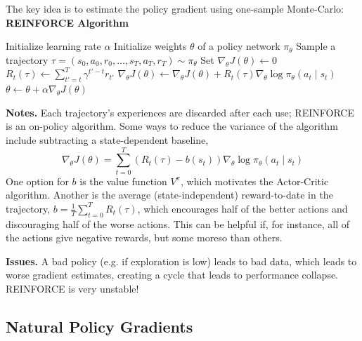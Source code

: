 \documentclass[11pt, letterpaper]{article}
\begin{document}
\begin{concept}
    The key idea is to estimate the policy gradient using one-sample Monte-Carlo:
    \algline
    \textbf{REINFORCE Algorithm}
    \begin{algorithmic}[1]
    \State Initialize learning rate \(\alpha\)
    \State Initialize weights \(\theta\) of a policy network \(\pi_\theta\)
        \State Sample a trajectory \(\tau = (s_0, a_0, r_0, \dots, s_T, a_T, r_T) \sim \pi_\theta\)
        \State Set \(\nabla_\theta J(\theta) \gets 0\)
            \State \(R_t(\tau) \gets \sum_{t'=t}^T \gamma^{t'-t} r_{t'}\)
            \State \(\nabla_\theta J(\theta) \gets \nabla_\theta J(\theta) + R_t(\tau) \nabla_\theta \log \pi_\theta(a_t \mid s_t)\)
        \EndFor
        \State \(\theta \leftarrow \theta + \alpha \nabla_\theta J(\theta)\)
    \EndFor
    \end{algorithmic}
    \algline
\end{concept}

\begin{remark}
    \textbf{Notes.} Each trajectory's experiences are discarded after each use; REINFORCE is an on-policy algorithm. Some ways to reduce the variance of the algorithm include subtracting a state-dependent baseline, 
    \[
        \nabla_\theta J(\theta) = \sum_{t=0}^T (R_t(\tau) - b(s_t)) \nabla_\theta \log \pi_\theta(a_t \mid s_t)
    \]
    One option for \(b\) is the value function \(V^\pi\), which motivates the Actor-Critic algorithm. Another is the average (state-independent) reward-to-date in the trajectory, \(b = \frac{1}{T} \sum_{t=0}^T R_t(\tau)\), which encourages half of the better actions and discouraging half of the worse actions. This can be helpful if, for instance, all of the actions give negative rewards, but some moreso than others.

    \textbf{Issues.} A bad policy (e.g. if exploration is low) leads to bad data, which leads to worse gradient estimates, creating a cycle that leads to performance collapse. REINFORCE is very unstable! 
\end{remark}

\subsection{Natural Policy Gradients}
\end{document}
